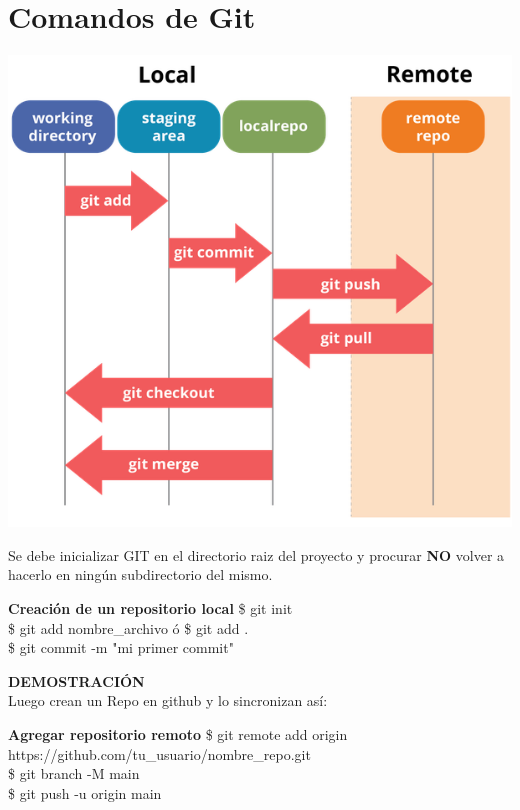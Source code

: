 \documentclass{beamer}
\begin{document}
\section{Comandos de Git}
	\begin{frame}
		\begin{center}
			\includegraphics[scale=.3]{img/git_diagram.png}
		\end{center}
	\end{frame}
	\begin{frame}
	Se debe inicializar GIT en el directorio raiz del proyecto y procurar \textbf{NO} volver a hacerlo en ningún subdirectorio del mismo. 
		\begin{block}{\textbf{Creación de un repositorio local}}
			\$ git init\\
			\vspace{0.3cm}
			\$ git add nombre\_archivo ó \$ git add .\\
			\vspace{0.3cm}
			\$ git commit -m "mi primer commit" \\
			\vspace{0.3cm}
		\end{block}	
	\end{frame}

	\begin{frame}
	\textbf{DEMOSTRACIÓN}\\ Luego crean un Repo en github y lo sincronizan así:
		\begin{block}{\textbf{Agregar repositorio remoto}}
			\small \$ git remote add origin https://github.com/tu\_usuario/nombre\_repo.git\\
			\vspace{0.3cm}
			\small \$ git branch -M main\\
			\vspace{0.3cm}
			\small \$ git push -u origin main \\
			\vspace{0.3cm}
		\end{block}	
	\end{frame}
\end{document}
